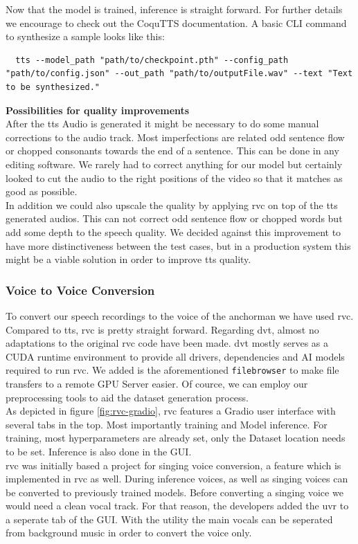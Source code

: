\documentclass[
  a4paper,  %
  twoside,  %
  bibliography=totoc,
  headsepline,
  cleardoublepage=empty,
  parskip=half,
  draft=false
]{scrbook}
\begin{document}
Now that the model is trained, inference is straight forward. For further details we encourage to check out the CoquTTS documentation. A basic CLI command to synthesize a sample looks like this:
\begin{lstlisting}
  tts --model_path "path/to/checkpoint.pth" --config_path "path/to/config.json" --out_path "path/to/outputFile.wav" --text "Text to be synthesized."
\end{lstlisting}

\textbf{Possibilities for quality improvements} \\
After the \gls{tts} Audio is generated it might be necessary to do some manual corrections to the audio track. Most imperfections are related odd sentence flow or chopped consonants towards the end of a sentence. This can be done in any editing software. We rarely had to correct anything for our model but certainly looked to cut the audio to the right positions of the video so that it matches as good as possible. \\
In addition we could also upscale the quality by applying \gls{rvc} on top of the \gls{tts} generated audios. This can not correct odd sentence flow or chopped words but add some depth to the speech quality. We decided against this improvement to have more distinctiveness between the test cases, but in a production system this might be a viable solution in order to improve \gls{tts} quality. 

\subsubsection{Voice to Voice Conversion}
To convert our speech recordings to the voice of the anchorman we have used \gls{rvc}. Compared to \gls{tts}, \gls{rvc} is pretty straight forward. Regarding \gls*{dvt}, almost no adaptations to the original \gls*{rvc} \cite*{RVCProjectRetrievalbasedVoiceConversionWebUI2023} code have been made. \gls*{dvt} mostly serves as a CUDA runtime environment to provide all drivers, dependencies and AI models required to run \gls{rvc}. We added is the aforementioned \verb|filebrowser| to make file transfers to a remote GPU Server easier. Of cource, we can employ our preprocessing tools to aid the dataset generation process.\\
As depicted in figure \ref{fig:rvc-gradio}, \gls{rvc} features a Gradio user interface with several tabs in the top. Most importantly training and Model inference. For training, most hyperparameters are already set, only the Dataset location needs to be set. Inference is also done in the GUI. \\
\gls{rvc} was initially based a project for singing voice conversion, a feature which is implemented in \gls{rvc} as well. During inference voices, as well as singing voices can be converted to previously trained models. Before converting a singing voice we would need a clean vocal track. For that reason, the developers added the \gls{uvr} to a seperate tab of the GUI. With the utility the main vocals can be seperated from background music in order to convert the voice only.
\end{document}

